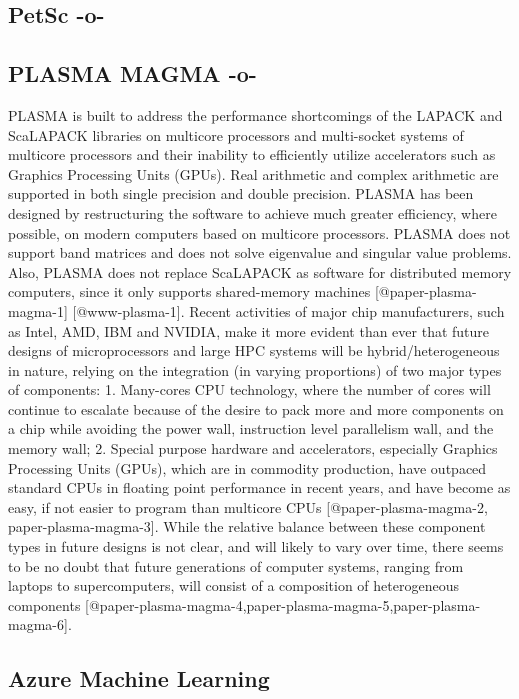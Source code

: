 \subsection{PetSc -o-}



\subsection{PLASMA MAGMA -o-}

PLASMA is built to address the performance shortcomings of the LAPACK
and ScaLAPACK libraries on multicore processors and multi-socket
systems of multicore processors and their inability to efficiently
utilize accelerators such as Graphics Processing Units (GPUs). Real
arithmetic and complex arithmetic are supported in both single
precision and double precision.  PLASMA has been designed by
restructuring the software to achieve much greater efficiency, where
possible, on modern computers based on multicore processors. PLASMA
does not support band matrices and does not solve eigenvalue and
singular value problems. Also, PLASMA does not replace ScaLAPACK as
software for distributed memory computers, since it only supports
shared-memory machines [@paper-plasma-magma-1]
[@www-plasma-1]. Recent activities of major chip manufacturers,
such as Intel, AMD, IBM and NVIDIA, make it more evident than ever
that future designs of microprocessors and large HPC systems will be
hybrid/heterogeneous in nature, relying on the integration (in varying
proportions) of two major types of components: 1. Many-cores CPU
technology, where the number of cores will continue to escalate
because of the desire to pack more and more components on a chip while
avoiding the power wall, instruction level parallelism wall, and the
memory wall; 2. Special purpose hardware and accelerators, especially
Graphics Processing Units (GPUs), which are in commodity production,
have outpaced standard CPUs in floating point performance in recent
years, and have become as easy, if not easier to program than
multicore CPUs [@paper-plasma-magma-2, paper-plasma-magma-3].
While the relative balance between these component types in future
designs is not clear, and will likely to vary over time, there seems
to be no doubt that future generations of computer systems, ranging
from laptops to supercomputers, will consist of a composition of
heterogeneous components
[@paper-plasma-magma-4,paper-plasma-magma-5,paper-plasma-magma-6].




\subsection{Azure Machine Learning}
    
